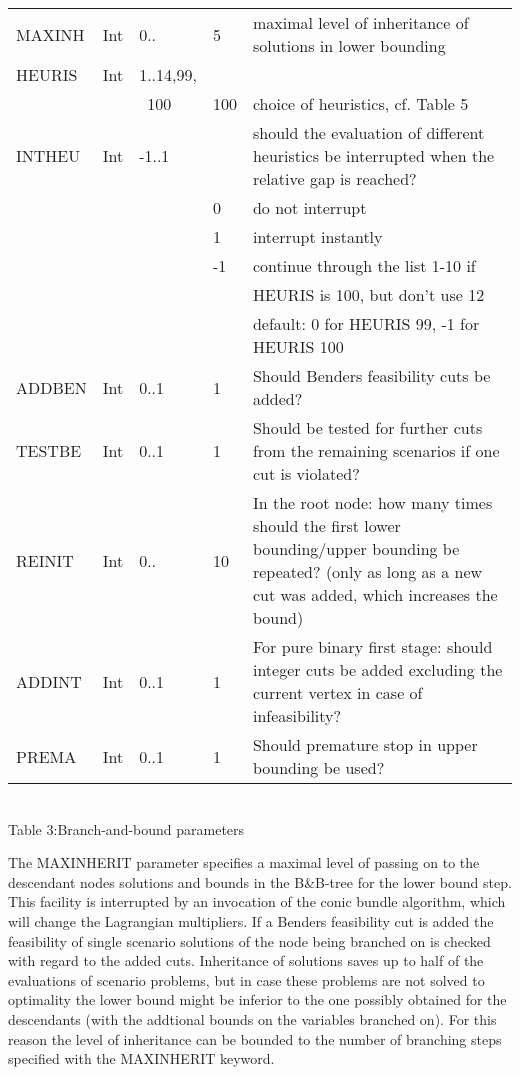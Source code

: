 \documentclass[11pt,draft]{article}
\newcommand{\+}{{\ti{+}}}
\newcommand{\1}{{\ti{1}}}
\begin{document}
\begin{center}
\begin{supertabular}{|llllp{6.2cm}|}
MAXINH&Int&0..&5&maximal level of inheritance of solutions in lower bounding\\[0.2em]
HEURIS&Int&1..14,99,&&\\&&\mbox{  }100&100&choice of heuristics, cf. Table 5\\[0.2em]
INTHEU&Int&-1..1&&should the evaluation of different heuristics be interrupted when the relative gap is reached?\\
&&&0& do not interrupt\\
&&&1& interrupt instantly\\
&&&-1& continue through the list 1-10 if\\&&&& HEURIS is 100, but don't use 12\\
      &   &      &&default: 0 for HEURIS 99, -1 for HEURIS 100\\[0.2em]
ADDBEN&Int&0..1&1&Should Benders feasibility cuts be added?\\[0.2em]
TESTBE&Int&0..1&1&Should be tested for further cuts from the remaining scenarios if one cut is violated?\\[0.2em]
REINIT&Int&0..&10&In the root node: how many times should the first lower bounding/upper bounding be repeated? (only as long as a new cut was added, which increases the bound)\\[0.2em]
ADDINT&Int&0..1&1&For pure binary first stage: should integer cuts be added excluding the current vertex in case of infeasibility?\\[0.2em]
PREMA&Int&0..1&1&Should premature stop in upper bounding be used?\\[0.2em]
\hline
\end{supertabular}\\[0.5em]
{Table 3:\quad Branch-and-bound parameters}
\end{center}

The MAXINHERIT parameter specifies a maximal level of passing on to the descendant nodes solutions and bounds in the B\&B-tree
for the lower bound step.
This facility is interrupted by an invocation of the conic bundle algorithm, which will change the
Lagrangian multipliers.
If a Benders feasibility cut is added the feasibility of single scenario solutions of the node being branched on
is checked with regard to the added cuts.
Inheritance of solutions saves up to half of the evaluations of scenario problems, but in case these problems
are not solved to optimality the lower bound might be inferior to the one possibly obtained for the descendants
(with the addtional bounds on the variables branched on).
For this reason the level of inheritance can be bounded to the number
of branching steps specified with the \mbox{MAXINHERIT} keyword.
\end{document}
